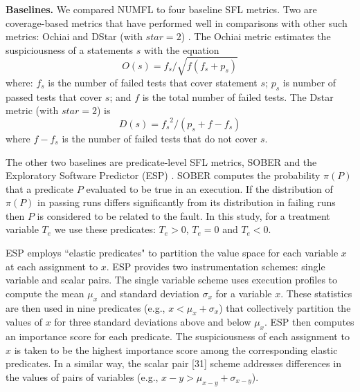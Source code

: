 \documentclass[times]{stvrauth}
\begin{document}
{\bf Baselines.}  We compared NUMFL to four baseline SFL metrics.  Two are coverage-based metrics that have performed well in comparisons with other such metrics: Ochiai \cite{Abreu2007} and DStar (with $star = 2$) \cite{Wong2014}.   The Ochiai metric estimates the suspiciousness of a statements $s$ with the equation
\begin{equation}
O(s) = {f_s}/\sqrt {f({f_s} + {p_s})}
\end{equation}
where: $f_s$ is the number of failed tests that cover statement $s$; $p_s$ is number of passed tests that cover $s$; and $f$ is the total number of failed tests.  The Dstar metric (with $star = 2$) is
\begin{equation}
D(s) = {f_s}^2/({p_s} + f - {f_s})
\end{equation}
where $f-f_s$ is the number of failed tests that do not cover $s$.

The other two baselines are predicate-level SFL metrics, SOBER \cite{Liu2005} and the Exploratory Software Predictor (ESP) \cite{Gore2011}.  SOBER computes the probability $\pi(P)$ that a predicate $P$ evaluated to be true in an execution.  If the distribution of $\pi(P)$ in passing runs differs significantly from its distribution in failing runs then $P$ is considered to be related to the fault.  In this study, for a treatment variable $T_e$ we use these predicates\cite{Liblit2004}: $T_e>0$, $T_e=0$ and $T_e<0$.

ESP employs ``elastic predicates" to partition the value space for each variable $x$ at each assignment to $x$.  ESP provides two instrumentation schemes: single variable and scalar pairs.  The single variable scheme uses execution profiles to compute the mean $\mu_x$ and standard deviation $\sigma_x$ for a variable $x$.  These statistics are then used in nine predicates (e.g., $x<\mu_x+\sigma_x$) that collectively partition the values of $x$ for three standard deviations above and below $\mu_x$.  ESP then computes an importance score for each predicate.  The suspiciousness of each assignment to $x$ is taken to be the highest importance score among the corresponding elastic predicates.  In a similar way, the scalar pair [31] scheme addresses differences in the values of pairs of variables (e.g.,  $x-y>\mu_{x-y}+\sigma_{x-y}$).
\end{document}
